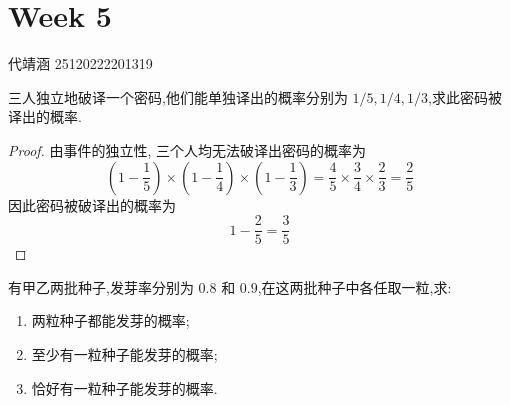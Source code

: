 \documentclass[../main.tex]{subfiles}
\begin{document}
\ifSubfilesClassLoaded{

    
    \setcounter{chapter}{4}
}{}

\chapter{ Week 5 }
代靖涵 25120222201319

\begin{exercise}{}{}
三人独立地破译一个密码,他们能单独译出的概率分别为 $1/5,1/4,1/3$,求此密码被译出的概率.
\end{exercise}

\begin{proof}
    由事件的独立性, 三个人均无法破译出密码的概率为 \[
    \left( 1-\frac{1 }{5 }  \right)\times \left( 1-\frac{1 }{4 }  \right)\times \left( 1-\frac{1 }{3 }  \right)= \frac{4 }{5 }\times \frac{3 }{4 }\times \frac{2 }{3 }=    \frac{2 }{5 } 
    \]因此密码被破译出的概率为 \[
1-\frac{2 }{5 }= \frac{3 }{5 }      \]
\end{proof}
\begin{exercise}{}{}
有甲乙两批种子,发芽率分别为 $0.8$ 和 $0.9$,在这两批种子中各任取一粒,求:
\begin{enumerate}
    \item 两粒种子都能发芽的概率;
    \item 至少有一粒种子能发芽的概率;
    \item 恰好有一粒种子能发芽的概率.
\end{enumerate}
\end{exercise}
\end{document}
